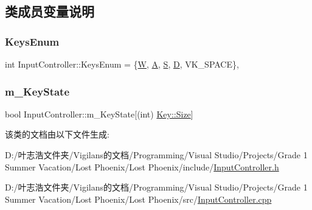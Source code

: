 \subsection{类成员变量说明}
\mbox{\label{class_input_controller_afa9908a71b2107375b9104e51b465b06}} 
\subsubsection{\texorpdfstring{Keys\+Enum}{KeysEnum}}
{\footnotesize\ttfamily int Input\+Controller\+::\+Keys\+Enum = \{\textquotesingle{}\hyperlink{_input_controller_8h_ab3c7af4820830f9166ede9e5623c4e73a61e9c06ea9a85a5088a499df6458d276}{W}\textquotesingle{}, \textquotesingle{}\hyperlink{_input_controller_8h_ab3c7af4820830f9166ede9e5623c4e73a7fc56270e7a70fa81a5935b72eacbe29}{A}\textquotesingle{}, \textquotesingle{}\hyperlink{_input_controller_8h_ab3c7af4820830f9166ede9e5623c4e73a5dbc98dcc983a70728bd082d1a47546e}{S}\textquotesingle{}, \textquotesingle{}\hyperlink{_input_controller_8h_ab3c7af4820830f9166ede9e5623c4e73af623e75af30e62bbd73d6df5b50bb7b5}{D}\textquotesingle{}, V\+K\+\_\+\+S\+P\+A\+CE\}\hspace{0.3cm}{\ttfamily [static]}, {\ttfamily [private]}}

\mbox{\label{class_input_controller_aebe382d8d20e579a3f2c92b58ad53ac3}} 
\subsubsection{\texorpdfstring{m\+\_\+\+Key\+State}{m\_KeyState}}
{\footnotesize\ttfamily bool Input\+Controller\+::m\+\_\+\+Key\+State\mbox{[}(int) \hyperlink{_input_controller_8h_ab3c7af4820830f9166ede9e5623c4e73a6f6cb72d544962fa333e2e34ce64f719}{Key\+::\+Size}\mbox{]}\hspace{0.3cm}{\ttfamily [private]}}



该类的文档由以下文件生成\+:\begin{DoxyCompactItemize}
\item 
D\+:/叶志浩文件夹/\+Vigilans的文档/\+Programming/\+Visual Studio/\+Projects/\+Grade 1 Summer Vacation/\+Lost Phoenix/\+Lost Phoenix/include/\hyperlink{_input_controller_8h}{Input\+Controller.\+h}\item 
D\+:/叶志浩文件夹/\+Vigilans的文档/\+Programming/\+Visual Studio/\+Projects/\+Grade 1 Summer Vacation/\+Lost Phoenix/\+Lost Phoenix/src/\hyperlink{_input_controller_8cpp}{Input\+Controller.\+cpp}\end{DoxyCompactItemize}
